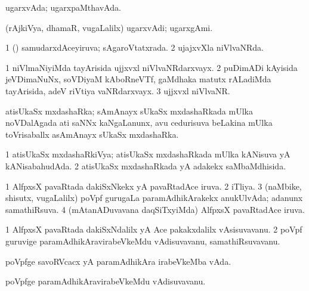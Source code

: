 {\bentry
{} 
\gl{\nA}
\expl{}
\bmng
ugarxvAda; ugarxpaMthavAda. 
\emng
\eentry

\bentry
{} 
\gl{\nA}
\expl{}
\bmng
(rAjkiVya, dhamaR, \mo vugaLalilx) ugarxvAdi; ugarxgAmi. 
\emng
\eentry

\bentry
{} 
\gl{\gu}
\expl{}
\bmng
\bnum
\num{1} (\pArxparx) samudarxdAceyiruva; sAgaroVtatxrada. 
\num{2} ujajxvXla niVlvaNRda. 
\enum
\emng
\eentry

\bentry
{} 
\gl{\nA}
\expl{}
\bmng
\bnum
\num{1} niVlmaNiyiMda tayArisida ujjxvxl niVlvaNRdarxvayx. 
\num{2} puDimADi kAyisida jeVDimaNuNx, soVDiyaM kAboRneVTf, gaMdhaka matutx rALadiMda tayArisida, adeV riVtiya vaNRdarxvayx. 
\num{3} ujjxvxl niVlvaNR. 
\enum
\emng
\eentry

\bentry
{} 
\gl{\nA}
\expl{}
\bmng
atisUkaSx mxdashaRka; sAmAnayx sUkaSx mxdashaRkada mUlka noVDalAgada ati saNNx kaNgaLanunx, avu cedurisuva beLakina mUlka toVrisaballx asAmAnayx sUkaSx mxdashaRka. 
\emng
\eentry

\bentry
{} 
\gl{\gu}
\expl{}
\bmng
\bnum
\num{1} atisUkaSx mxdashaRkiVya; atisUkaSx mxdashaRkada mUlka kANisuva yA kANisabahudAda. 
\num{2} atisUkaSx mxdashaRkada yA adakekx saMbaMdhisida. 
\enum
\emng
\eentry

\bentry
{} 
\gl{\gu}
\expl{}
\bmng
\bnum
\num{1} AlfpxsX pavaRtada dakiSxNkekx yA pavaRtadAce iruva. 
\num{2} iTliya. 
\num{3} (naMbike, shisutx, \mo vugaLalilx) poVpf gurugaLa paramAdhikArakekx anukUlvAda; adanunx samathiRsuva. 
\num{4} (mAtanADuvavana daqSiTxyiMda) AlfpxsX pavaRtadAce iruva. 
\enum
\emng
\eentry

\bentry
{} 
\gl{\nA}
\expl{}
\bmng
\bnum
\num{1} AlfpxsX pavaRtada dakiSxNdalilx yA Ace pakakxdalilx vAsisuvavanu. 
\num{2} poVpf guruvige paramAdhikAravirabeVkeMdu vAdisuvavanu, samathiRsuvavanu. 
\enum
\emng
\eentry

\bentry
{} 
\gl{\nA}
\expl{}
\bmng
poVpfge savoRVcacx yA paramAdhikAra irabeVkeMba vAda. 
\emng
\eentry

\bentry
{} 
\gl{\nA}
\expl{}
\bmng
poVpfge paramAdhikAravirabeVkeMdu vAdisuvavanu. 
\emng
\eentry

}
